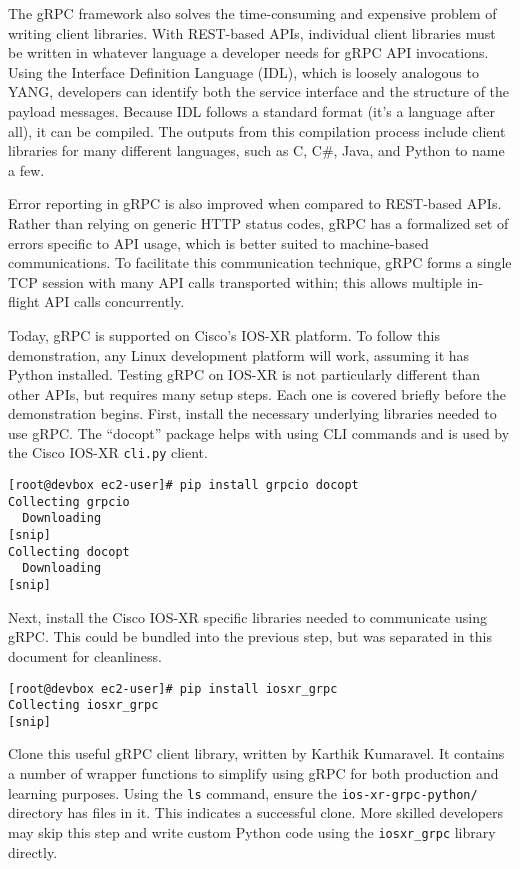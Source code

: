 The gRPC framework also solves the time-consuming and expensive problem of
writing client libraries. With REST-based APIs, individual client libraries
must be written in whatever language a developer needs for gRPC API
invocations. Using the Interface Definition Language (IDL), which is loosely
analogous to YANG, developers can identify both the service interface and the
structure of the payload messages. Because IDL follows a standard format (it's
a language after all), it can be compiled. The outputs from this compilation
process include client libraries for many different languages, such as C, C\#,
Java, and Python to name a few.

Error reporting in gRPC is also improved when compared to REST-based APIs.
Rather than relying on generic HTTP status codes, gRPC has a formalized set of
errors specific to API usage, which is better suited to machine-based
communications. To facilitate this communication technique, gRPC forms a
single TCP session with many API calls transported within; this allows
multiple in-flight API calls concurrently.

Today, gRPC is supported on Cisco's IOS-XR platform. To follow this
demonstration, any Linux development platform will work, assuming it has
Python installed. Testing gRPC on IOS-XR is not particularly different than
other APIs, but requires many setup steps. Each one is covered briefly before
the demonstration begins. First, install the necessary underlying libraries
needed to use gRPC\@. The ``docopt'' package helps with using CLI commands and is
used by the Cisco IOS-XR \verb|cli.py| client.

\begin{verbatim}
[root@devbox ec2-user]# pip install grpcio docopt
Collecting grpcio
  Downloading
[snip]
Collecting docopt
  Downloading
[snip]
\end{verbatim}

Next, install the Cisco IOS-XR specific libraries needed to communicate using
gRPC\@. This could be bundled into the previous step, but was separated in this
document for cleanliness.

\begin{verbatim}
[root@devbox ec2-user]# pip install iosxr_grpc
Collecting iosxr_grpc
[snip]
\end{verbatim}

Clone this useful gRPC client library, written by Karthik Kumaravel. It
contains a number of wrapper functions to simplify using gRPC for both
production and learning purposes. Using the \verb|ls| command, ensure the
\verb|ios-xr-grpc-python/| directory has files in it. This indicates a successful
clone. More skilled developers may skip this step and write custom Python code
using the \verb|iosxr_grpc| library directly.


